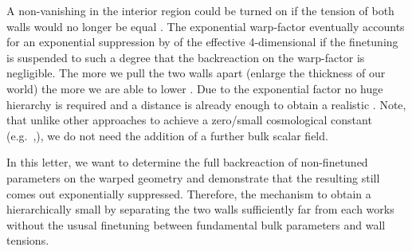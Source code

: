 \documentclass[a4paper,12pt]{article}
\begin{document}
A non-vanishing \myHighlight{$\Lambda$}\coordHE{} in the interior region \coordHE{} could be
turned on if the tension of both walls would no longer be equal
\cite{AK3}.  The exponential warp-factor eventually accounts for an
exponential suppression by \coordHE{} of the effective 4-dimensional
\coordHE{} if the finetuning is suspended to such a degree that the
backreaction on the warp-factor is negligible. The more we pull the
two walls apart (enlarge the thickness of our world) the
more we are able to lower \coordHE{}. Due to the exponential factor
no huge hierarchy is required and a distance \coordHE{} is already enough to obtain a realistic \coordHE{}.
Note, that unlike other approaches to achieve a zero/small
cosmological constant (e.g.~\cite{ADKS},\cite{KSS}), we do not need
the addition of a further bulk scalar field.

In this letter, we want to determine the full backreaction of
non-finetuned parameters on the warped geometry and demonstrate that
the resulting \coordHE{} still comes out exponentially
suppressed. Therefore, the mechanism to obtain a hierarchically small
\coordHE{} by separating the two walls sufficiently far from each
works without the ususal finetuning between fundamental bulk
parameters and wall tensions.
\end{document}
